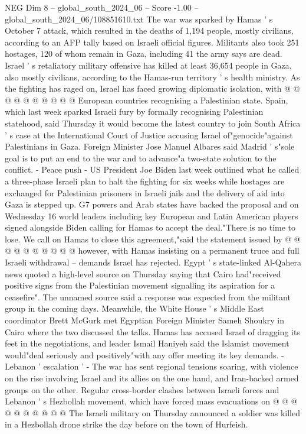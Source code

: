 \begin{textsample}{NEG Dim 8 – global\_south\_2024\_06 – Score -1.00 – global\_south\_2024\_06/108851610.txt}
The war was sparked by Hamas ' s October 7 attack, which resulted in the deaths of 1,194 people, mostly civilians, according to an AFP tally based on Israeli official figures.
Militants also took 251 hostages, 120 of whom remain in Gaza, including 41 the army says are dead.
Israel ' s retaliatory military offensive has killed at least 36,654 people in Gaza, also mostly civilians, according to the Hamas-run territory ' s health ministry.
As the fighting has raged on, Israel has faced growing diplomatic isolation, with @ @ @ @ @ @ @ @ @ @ European countries recognising a Palestinian state.
Spain, which last week sparked Israeli fury by formally recognising Palestinian statehood, said Thursday it would become the latest country to join South Africa ' s case at the International Court of Justice accusing Israel of"genocide"against Palestinians in Gaza.
Foreign Minister Jose Manuel Albares said Madrid ' s"sole goal is to put an end to the war and to advance"a two-state solution to the conflict. - Peace push - US President Joe Biden last week outlined what he called a three-phase Israeli plan to halt the fighting for six weeks while hostages are exchanged for Palestinian prisoners in Israeli jails and the delivery of aid into Gaza is stepped up.
G7 powers and Arab states have backed the proposal and on Wednesday 16 world leaders including key European and Latin American players signed alongside Biden calling for Hamas to accept the deal."There is no time to lose.
We call on Hamas to close this agreement,"said the statement issued by @ @ @ @ @ @ @ @ @ @ however, with Hamas insisting on a permanent truce and full Israeli withdrawal -- demands Israel has rejected.
Egypt ' s state-linked Al-Qahera news quoted a high-level source on Thursday saying that Cairo had"received positive signs from the Palestinian movement signalling its aspiration for a ceasefire".
The unnamed source said a response was expected from the militant group in the coming days.
Meanwhile, the White House ' s Middle East coordinator Brett McGurk met Egyptian Foreign Minister Sameh Shoukry in Cairo where the two discussed the talks.
Hamas has accused Israel of dragging its feet in the negotiations, and leader Ismail Haniyeh said the Islamist movement would"deal seriously and positively"with any offer meeting its key demands. - Lebanon ' escalation ' - The war has sent regional tensions soaring, with violence on the rise involving Israel and its allies on the one hand, and Iran-backed armed groups on the other.
Regular cross-border clashes between Israeli forces and Lebanon ' s Hezbollah movement, which have forced mass evacuations on @ @ @ @ @ @ @ @ @ @ The Israeli military on Thursday announced a soldier was killed in a Hezbollah drone strike the day before on the town of Hurfeish.

\end{textsample}
